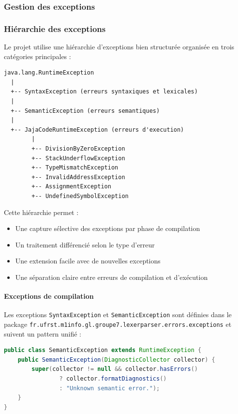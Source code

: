 \subsubsection{Gestion des exceptions}\label{subsec:gestion-des-exceptions}

\subsubsection{Hiérarchie des exceptions}

Le projet utilise une hiérarchie d'exceptions bien structurée organisée en trois catégories principales :

\begin{lstlisting}[caption=Hierarchie des exceptions,label={lst:hierarchie-des-exceptions}]
java.lang.RuntimeException
  |
  +-- SyntaxException (erreurs syntaxiques et lexicales)
  |
  +-- SemanticException (erreurs semantiques)
  |
  +-- JajaCodeRuntimeException (erreurs d'execution)
        |
        +-- DivisionByZeroException
        +-- StackUnderflowException
        +-- TypeMismatchException
        +-- InvalidAddressException
        +-- AssignmentException
        +-- UndefinedSymbolException
\end{lstlisting}

Cette hiérarchie permet :
\begin{itemize}
    \item Une capture sélective des exceptions par phase de compilation
    \item Un traitement différencié selon le type d'erreur
    \item Une extension facile avec de nouvelles exceptions
    \item Une séparation claire entre erreurs de compilation et d'exécution
\end{itemize}

\paragraph{Exceptions de compilation}

Les exceptions \texttt{SyntaxException} et \texttt{SemanticException} sont définies dans le package \texttt{fr.ufrst.m1info.gl.groupe7.lexerparser.errors.exceptions} et suivent un pattern unifié :

\vspace{0.3cm}
\begin{lstlisting}[language=java, caption=Pattern des exceptions de compilation,label={lst:compilation-exception-pattern}]
public class SemanticException extends RuntimeException {
    public SemanticException(DiagnosticCollector collector) {
        super(collector != null && collector.hasErrors()
                ? collector.formatDiagnostics()
                : "Unknown semantic error.");
    }
}
\end{lstlisting}

